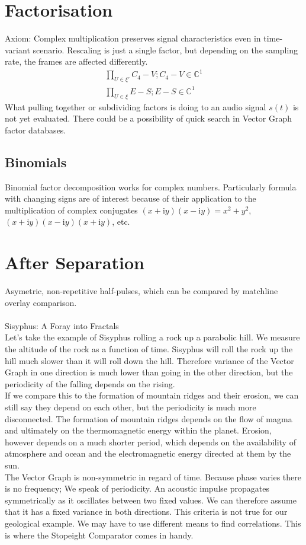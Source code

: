 \documentclass{report}
\begin{document}
\chapter{Factorisation}
Axiom: Complex multiplication preserves signal characteristics even in time-variant scenario. Rescaling is just a single factor, but depending on the sampling rate, the frames are affected differently.
\begin{align}
\prod \limits _{U \in \xi'} C_{4}-V;C_{4}-V \in \mathbb{C}^1\\
\prod \limits _{U \in \xi} E-S;E-S \in \mathbb{C}^1
\end{align}
What pulling together or subdividing factors is doing to an audio signal $s(t)$ is not yet evaluated. There could be a possibility of quick search in Vector Graph factor databases.
\section{Binomials}
Binomial factor decomposition works for complex numbers. Particularly formula with changing signs are of interest because of their application to the multiplication of complex conjugates $(x+\mathrm{i}y)(x-\mathrm{i}y)=x^2+y^2$, $(x+\mathrm{i}y)(x-\mathrm{i}y)(x+\mathrm{i}y)$, etc.

\chapter{After Separation}
Asymetric, non-repetitive half-pulses, which can be compared by matchline overlay comparison.\\\\
Sisyphus: A Foray into Fractals\\
Let's take the example of Sisyphus rolling a rock up a parabolic hill. We measure the altitude of the rock as a function of time. Sisyphus will roll the rock up the hill much slower than it will roll down the hill. Therefore variance of the Vector Graph in one direction is much lower than going in the other direction, but the periodicity of the falling depends on the rising.\\
If we compare this to the formation of mountain ridges and their erosion, we can still say they depend on each other, but the periodicity is much more disconnected. The formation of mountain ridges depends on the flow of magma and ultimately on the thermomagnetic energy within the planet. Erosion, however depends on a much shorter period, which depends on the availability of atmosphere and ocean and the electromagnetic energy directed at them by the sun.\\
The Vector Graph is non-symmetric in regard of time. Because phase varies there is no frequency; We speak of periodicity. An acoustic impulse propagates symmetrically as it oscillates between two fixed values. We can therefore assume that it has a fixed variance in both directions. This criteria is not true for our geological example. We may have to use different means to find correlations. This is where the Stopeight Comparator comes in handy.\\


\iffalse
\printbibliography
\fi
{}

\end{document}
